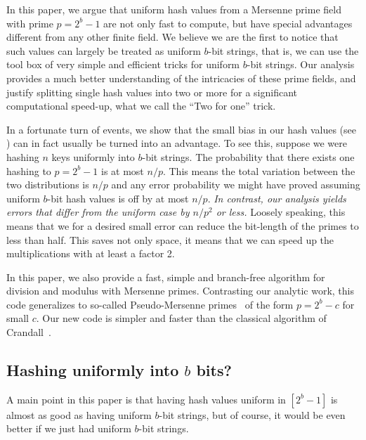 In this paper, we argue that uniform hash values from a Mersenne prime
field with prime $p=2^b-1$ are not only fast to compute, but have
special advantages different from any other finite field.  We believe
we are the first to notice that such values can largely be treated as
uniform $b$-bit strings, that is, we can use the tool box of very
simple and efficient tricks for uniform $b$-bit strings.
Our analysis provides a much better understanding of the intricacies of these prime fields,
and justify splitting single hash values into two or more for a significant computational speed-up, what we call the ``Two for one'' trick.

In a fortunate turn of events, we show that the small bias in our hash values (see ) can in fact usually be turned into an advantage.
To see this, suppose we were hashing $n$ keys uniformly into $b$-bit strings.
The probability that there exists one hashing to $p=2^b-1$ is at most $n/p$.
This means the total variation between the two distributions is $n/p$ and any error probability we might have proved assuming uniform $b$-bit hash values is off by at most $n/p$.
\emph{In contrast, our analysis yields errors that differ from the uniform case by $n/p^2$ or less.}
Loosely speaking, this means that we for a desired small error can reduce
the bit-length of the primes to less than half. This saves not only
space, it means that we can speed up the multiplications
with at least a factor 2.

In this paper, we also provide a fast, simple and branch-free algorithm for
division and modulus with Mersenne primes. Contrasting our analytic
work, this code generalizes to so-called Pseudo-Mersenne
primes~\cite{van2014encyclopedia} of the form $p=2^b-c$ for small
$c$. Our new code is simpler and faster than the classical algorithm of
Crandall~\cite{crandall1992method}. 
%

\subsection{Hashing uniformly into \texorpdfstring{$b$}{b} bits?}\label{sec:b-bit?}
A main point in this paper is that having hash values uniform in $[2^b-1]$
is almost as good as having uniform $b$-bit strings, but of course,
it would be even better if we just had uniform $b$-bit strings.

